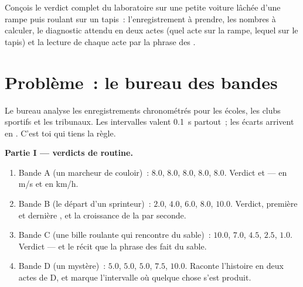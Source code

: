 \begin{exercise}[$\star\star\star$]\label{exo:g9:uniform-varied-motion:12}
Conçois le verdict complet du laboratoire sur une petite voiture
lâchée d'une rampe puis roulant sur un tapis~: l'enregistrement à
prendre, les nombres à calculer, le diagnostic attendu en deux actes
(quel acte sur la rampe, lequel sur le tapis) et la lecture de chaque
acte par la phrase des .
\end{exercise}

\section{Problème~: le bureau des bandes}

\begin{problem}\label{pb:g9:uniform-varied-motion:1}
Le bureau analyse les enregistrements chronométrés pour les écoles,
les clubs sportifs et les tribunaux. Les intervalles valent
\qty{0.1}{s} partout~; les écarts arrivent en . C'est toi
qui tiens la règle.

\medskip\noindent\textbf{Partie I --- verdicts de routine.}
\begin{enumerate}
  \item Bande A (un marcheur de couloir)~: $8.0$, $8.0$, $8.0$,
        $8.0$, $8.0$. Verdict et  --- en \unit{m/s} et en
        \unit{km/h}.
  \item Bande B (le départ d'un sprinteur)~: $2.0$, $4.0$, $6.0$,
        $8.0$, $10.0$. Verdict, première et dernière , et
        la croissance de la  par seconde.
  \item Bande C (une bille roulante qui rencontre du sable)~:
        $10.0$, $7.0$, $4.5$, $2.5$, $1.0$. Verdict --- et le
        récit que la phrase des  fait du sable.
  \item Bande D (un mystère)~: $5.0$, $5.0$, $5.0$, $7.5$, $10.0$.
        Raconte l'histoire en deux actes de D, et marque
        l'intervalle où quelque chose s'est produit.
\end{enumerate}


\end{problem}
